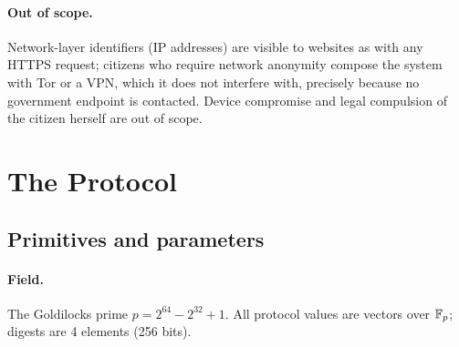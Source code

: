 \documentclass[11pt]{article}
\theoremstyle{definition}
\begin{document}
\paragraph{Out of scope.} Network-layer identifiers (IP addresses) are visible to websites
as with any HTTPS request; citizens who require network anonymity compose the system with
Tor or a VPN, which it does not interfere with, precisely because no government endpoint
is contacted. Device compromise and legal compulsion of the citizen herself are out of
scope.

\section{The Protocol}
\label{sec:protocol}

\subsection{Primitives and parameters}
\label{sec:prims}

\paragraph{Field.} The Goldilocks prime $p = 2^{64} - 2^{32} + 1$. All protocol values are
vectors over $\mathbb{F}_p$; digests are 4 elements (256 bits).
\end{document}

